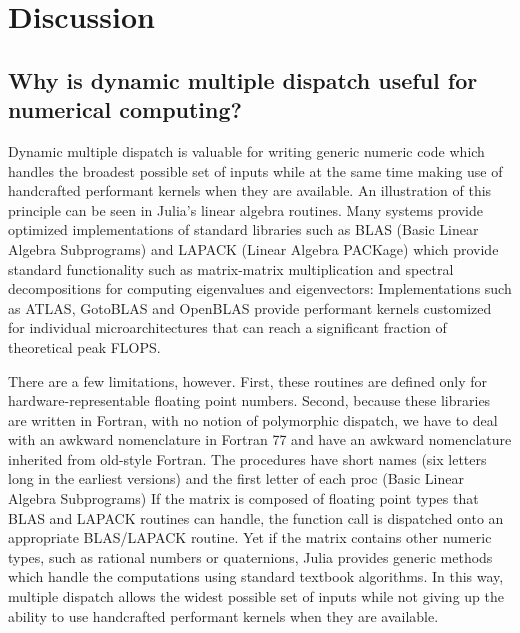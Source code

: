 \section{Discussion}

\subsection{Why is dynamic multiple dispatch useful for numerical computing?}

Dynamic multiple dispatch is valuable for writing generic numeric code which
handles the broadest possible set of inputs while at the same time making use
of handcrafted performant kernels when they are available. An illustration of
this principle can be seen in Julia's linear algebra routines. Many systems
provide optimized implementations of standard libraries such as BLAS (Basic
Linear Algebra Subprograms) and LAPACK (Linear Algebra PACKage) which provide
standard functionality such as matrix-matrix multiplication and spectral
decompositions for computing eigenvalues and eigenvectors: Implementations such
as ATLAS, GotoBLAS and OpenBLAS provide performant kernels customized for
individual microarchitectures that can reach a significant fraction of
theoretical peak FLOPS. 

There are a few limitations, however. First, these routines are defined only for
hardware-representable floating point numbers. Second, because these libraries are written in Fortran, with no notion of polymorphic dispatch, we have to deal with an awkward nomenclature 
in Fortran 77 and have an awkward nomenclature inherited from old-style
Fortran. The procedures have short names (six letters long in the earliest
versions) and the first letter of each proc (Basic Linear Algebra Subprograms)
If the matrix is composed of floating point types that BLAS and
LAPACK routines can handle, the function call is dispatched onto an
appropriate BLAS/LAPACK routine. Yet if the matrix contains other
numeric types, such as rational numbers or quaternions, Julia provides
generic methods which handle the computations using standard textbook
algorithms. In this way, multiple dispatch allows the widest possible
set of inputs while not giving up the ability to use handcrafted
performant kernels when they are available.


